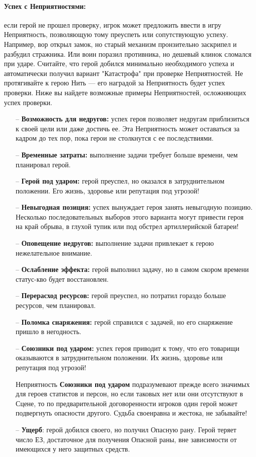 \paragraph{Успех с Неприятностями:} если герой не прошел проверку, игрок может предложить ввести в игру Неприятность, позволяющую тому преуспеть или сопутствующую успеху. Например, вор открыл замок, но старый механизм пронзительно заскрипел и разбудил стражника. Или воин поразил противника, но дешевый клинок сломался при ударе. Считайте, что герой добился минимально необходимого успеха и автоматически получил вариант "Катастрофа" при проверке Неприятностей. Не протягивайте к герою Нить — его наградой за Неприятность будет успех проверки. Ниже вы найдете возможные примеры Неприятностей, осложняющих успех проверки.
\begin{itemize}
\item[--] \textbf{Возможность для недругов:} успех героя позволяет недругам приблизиться к своей цели или даже достичь ее. Эта Неприятность может оставаться за кадром до тех пор, пока герои не столкнутся с ее последствиями.
\item[--] \textbf{Временные затраты:} выполнение задачи требует больше времени, чем планировал герой.
\item[--] \textbf{Герой под ударом:} герой преуспел, но оказался в затруднительном положении. Его жизнь, здоровье или репутация под угрозой!
\item[--] \textbf{Невыгодная позиция:} успех вынуждает героя занять невыгодную позицию. Несколько последовательных выборов этого варианта могут привести героя на край обрыва, в глухой тупик или под обстрел артиллерийской батареи!
\item[--] \textbf{Оповещение недругов:} выполнение задачи привлекает к герою нежелательное внимание.
\item[--] \textbf{Ослабление эффекта:} герой выполнил задачу, но в самом скором времени статус-кво будет восстановлен.
\item[--] \textbf{Перерасход ресурсов:} герой преуспел, но потратил гораздо больше ресурсов, чем планировал.
\item[--] \textbf{Поломка снаряжения:} герой справился с задачей, но его снаряжение пришло в негодность.
\item[--] \textbf{Союзники под ударом:} успех героя приводит к тому, что его товарищи оказываются в затруднительном положении. Их жизнь, здоровье или репутация под угрозой!
\begin{tcolorbox}
Неприятность \textbf{Союзники под ударом} подразумевают прежде всего значимых для героев статистов и персон, но если таковых нет или они отсутствуют в Сцене, то по предварительной договоренности игроков один герой может подвергнуть опасности другого. Судьба своенравна и жестока, не забывайте!
\end{tcolorbox}
\item[--] \textbf{Ущерб}: герой добился своего, но получил Опасную рану. Герой теряет число ЕЗ, достаточное для получения Опасной раны, вне зависимости от имеющихся у него защитных средств.
\end{itemize}
